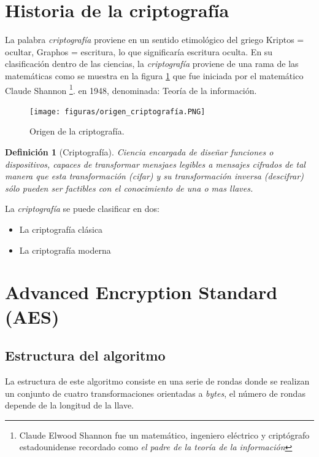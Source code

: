 \documentclass[peerreview]{IEEEtran}
\newtheorem{defin}{Definición}
\begin{document}
\section{Historia de la criptografía}
La palabra \textit{criptografía} proviene en un sentido etimológico  del griego Kriptos = ocultar, Graphos = escritura, lo que significaría escritura oculta.
\bigbreak
En su clasificación dentro de las ciencias, la \textit{criptografía} proviene de una rama de las matemáticas como se muestra en la figura \ref{fig: 2} que fue iniciada por el matemático Claude Shannon \footnote{Claude Elwood Shannon fue un matemático, ingeniero eléctrico y criptógrafo estadounidense recordado como \textit{el padre de la teoría de la información}}. en 1948, denominada: Teoría de la información.

\begin{figure}[htbp]
\centering
\texttt{[image: figuras/origen\_criptografía.PNG]} 
\caption{Origen de la criptografía.}
\label{fig: 2}
\end{figure}

\begin{defin}[Criptografía]
Ciencia encargada de diseñar funciones o dispositivos, capaces de transformar mensjaes legibles a mensajes cifrados de tal manera que esta transformación (cifar) y su transformación inversa (descifrar) sólo pueden ser factibles con el conocimiento de una o mas llaves.
\end{defin}
\bigbreak
La \textit{criptografía} se puede clasificar en dos: \begin{itemize}
    \item La criptografía clásica
    \item La criptografía moderna
\end{itemize}
\section{Advanced Encryption Standard (AES)}
\subsection{Estructura del algoritmo}
La estructura de este algoritmo consiste en una serie de rondas donde se realizan un conjunto de cuatro transformaciones orientadas a \textit{bytes}, el número de rondas depende de la longitud de la llave.
\end{document}
